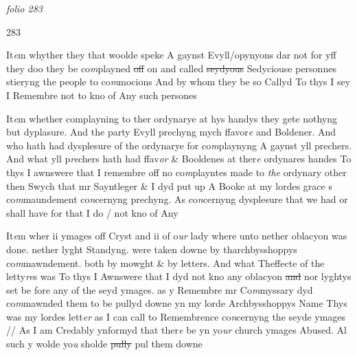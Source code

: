 \documentclass[12pt, a4paper]{book}
\begin{document}
\dotfill
						\newpage
{}

\textit{folio 283}


 	\begin{flushright}{\color{Mahogany}283}\end{flushright}

 	
				\marginpar[\vspace{0.5cm}{\textcolor{Gray}{9}}]{}
			
 
		\ifthenelse{\isodd{\thepage}}
		{\reversemarginpar}
		{\normalmarginpar}
		It\textit{e}m whyther they that woolde speke A gaynst Evyll/opynyons
dar not for yff they doo they be co\textit{m}playned \sout{off }on and called \sout{seydyous}
Sedyciouse personnes stieryng the people to co\textit{m}mocions And by whom 
they be so Callyd
To thys I sey I Remembre not to kno of Any such persones
 	
				\marginpar[\vspace{0.5cm}{\textcolor{Gray}{10}}]{}
			

		\ifthenelse{\isodd{\thepage}}
		{\reversemarginpar}
		{\normalmarginpar}
		It\textit{e}m whether complayning to ther ordynarye at hys handys they gete
nothyng but dyplasure. And the party Evyll prechyng mych ffavor\textit{e}
and Boldener. And who hath had dysplesure of the ordynarye for
co\textit{m}playnyng A gaynst yll prechers. And what yll p\textit{re}chers hath had
ffav\textit{or} \& Booldenes at ther\textit{e} ordynares handes
To thys I awnswere that I remembre off no co\textit{m}playntes made to \textit{the} ordynary
other then Swych that mr Sayntleger \& I dyd put up A Booke at 
my lordes grace s co\textit{m}maundement co\textit{n}cernyng prechyng. As co\textit{n}cernyng dysplesure
that we had or shall have for that I do / not kno of Any
 	
				\marginpar[\vspace{0.5cm}{\textcolor{Gray}{11}}]{}
			

		\ifthenelse{\isodd{\thepage}}
		{\reversemarginpar}
		{\normalmarginpar}
		 It\textit{e}m wher ii ymages off Cryst and ii of o\textit{ur} lady where unto nether oblacyon
was done. nether lyght Standyng. were taken downe by tharchbysshoppys
co\textit{m}mawndement. both by mowght \& by letters. And what Theffecte
of the letty\textit{re}s was
To thys I Awnswere that I dyd not kno any oblacyon \sout{and}
               nor 
			lyghtys set
be fore any of the seyd ymages. as y Remembre mr Co\textit{m}myssary dyd 
co\textit{m}mawnded them to be pullyd downe yn my lorde Archbysshoppys Name
Thys was my lordes lett\textit{er} as I can call to Remembrence co\textit{n}cernyng the seyde
ymages // As I am Credably ynformyd that ther\textit{e} be yn yo\textit{ur} church
ymages Abused. Al such y wolde yo\textit{u} sholde \sout{pully }pul them 
downe
 	
\end{document}
